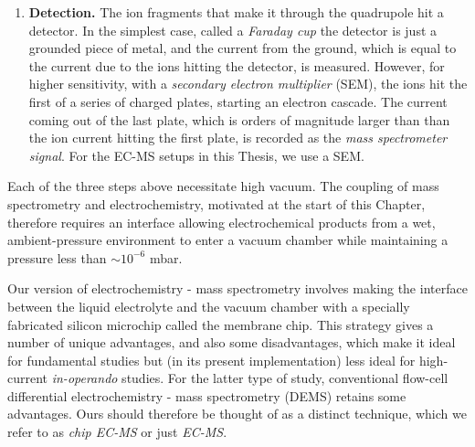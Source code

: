 \begin{enumerate}
	\item \textbf{Detection.} The ion fragments that make it through the quadrupole hit a detector. In the simplest case, called a \textit{Faraday cup} the detector is just a grounded piece of metal, and the current from the ground, which is equal to the current due to the ions hitting the detector, is measured. However, for higher sensitivity, with a \textit{secondary electron multiplier} (SEM), the ions hit the first of a series of charged plates, starting an electron cascade. The current coming out of the last plate, which is orders of magnitude larger than than the ion current hitting the first plate, is recorded as the \textit{mass spectrometer signal}. For the EC-MS setups in this Thesis, we use a SEM.
\end{enumerate}

Each of the three steps above necessitate high vacuum\cite{Gross2007, PfeifferKnowhow}. 
The coupling of mass spectrometry and electrochemistry, motivated at the start of this Chapter, therefore requires an interface allowing electrochemical products from a wet, ambient-pressure environment to enter a vacuum chamber while maintaining a pressure less than $\sim 10^{-6}$ mbar.

Our version of electrochemistry - mass spectrometry involves making the interface between the liquid electrolyte and the vacuum chamber with a specially fabricated silicon microchip called the membrane chip. This strategy gives a number of unique advantages, and also some disadvantages, which make it ideal for fundamental studies but (in its present implementation) less ideal for high-current \textit{in-operando} studies. For the latter type of study, conventional flow-cell differential electrochemistry - mass spectrometry (DEMS)\cite{Baltruschat2004} retains some advantages. Ours should therefore be thought of as a distinct technique, which we refer to as \textit{chip EC-MS} or just \textit{EC-MS}.

